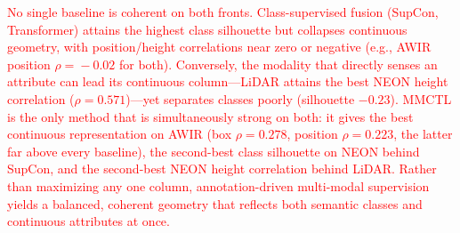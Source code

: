 \documentclass[10pt,twocolumn,letterpaper]{article}
\newcommand{\new}[1]{\textcolor{red}{#1}}
\begin{document}
\new{No single baseline is coherent on both fronts. Class-supervised fusion (SupCon, Transformer) attains the highest class silhouette but collapses continuous geometry, with position/height correlations near zero or negative (e.g., AWIR position $\rho\!=\!-0.02$ for both). Conversely, the modality that directly senses an attribute can lead its continuous column---LiDAR attains the best NEON height correlation ($\rho\!=\!0.571$)---yet separates classes poorly (silhouette $-0.23$). MMCTL is the only method that is simultaneously strong on both: it gives the best continuous representation on AWIR (box $\rho\!=\!0.278$, position $\rho\!=\!0.223$, the latter far above every baseline), the second-best class silhouette on NEON behind SupCon, and the second-best NEON height correlation behind LiDAR. Rather than maximizing any one column, annotation-driven multi-modal supervision yields a balanced, coherent geometry that reflects both semantic classes and continuous attributes at once.}


\newcommand{\err}[1]{\,\scriptstyle\pm\,\!#1}
\end{document}
